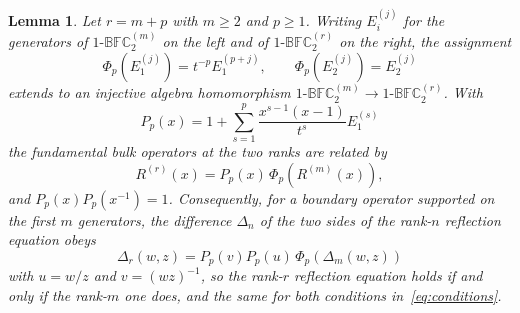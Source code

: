 \documentclass[
  aps,pre,
  reprint,
  superscriptaddress,
  amsmath,amssymb,
  floatfix
]{revtex4-2}
\theoremstyle{plain}
\newtheorem{lemma}[theorem]{Lemma}
\theoremstyle{definition}
\theoremstyle{remark}
\newcommand{\BFC}{1\text{-}\mathbb{BFC}^{(r)}_2}
\newcommand{\BFCm}{1\text{-}\mathbb{BFC}^{(m)}_2}
\begin{document}
\begin{lemma}
\label{lem:peeling}
Let $r=m+p$ with $m\ge2$ and $p\ge1$. Writing $E_i^{(j)}$ for the generators of
$\BFCm$ on the left and of $\BFC$ on the right, the assignment
\begin{equation}
  \Phi_p(E_1^{(j)})=t^{-p}E_1^{(p+j)},\qquad
  \Phi_p(E_2^{(j)})=E_2^{(j)}
  \label{eq:phi}
\end{equation}
extends to an injective algebra homomorphism $\BFCm\to\BFC$. With
\begin{equation}
  P_p(x)=1+\sum_{s=1}^{p}\frac{x^{s-1}(x-1)}{t^s}E_1^{(s)}
  \label{eq:prefix}
\end{equation}
the fundamental bulk operators at the two ranks are related by
\begin{equation}
  R^{(r)}(x)=P_p(x)\,\Phi_p\!\left(R^{(m)}(x)\right),
  \label{eq:bulk-factorization}
\end{equation}
and $P_p(x)P_p(x^{-1})=1$. Consequently, for a boundary operator supported on
the first $m$ generators, the difference $\Delta_n$ of the two sides of the
rank-$n$ reflection equation obeys
\begin{equation}
  \Delta_r(w,z)=P_p(v)P_p(u)\,\Phi_p\!\left(\Delta_m(w,z)\right)
  \label{eq:reflection-factorization}
\end{equation}
with $u=w/z$ and $v=(wz)^{-1}$, so the rank-$r$ reflection equation holds if
and only if the rank-$m$ one does, and the same for
both conditions in~\eqref{eq:conditions}.
\end{lemma}
\end{document}
